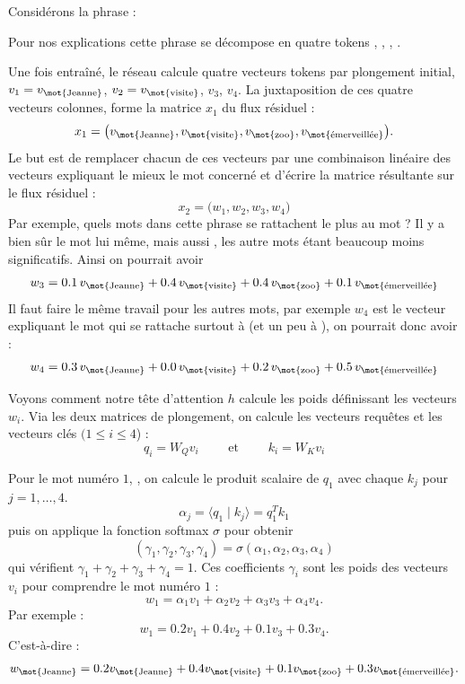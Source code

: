 \documentclass[11pt,class=report,crop=false]{standalone}
\begin{document}
Considérons la phrase :


Pour nos explications cette phrase se décompose en quatre tokens , ,
, . 

Une fois entraîné, le réseau calcule quatre vecteurs tokens par plongement initial,
$v_1 =  v_{\text{\mot{Jeanne}}}$, $v_2 = v_{\text{\mot{visite}}}$, $v_3$, $v_4$.
La juxtaposition de ces quatre vecteurs colonnes, forme la matrice $x_1$ du flux résiduel :
$$x_ 1 = \big( 
v_{\text{\mot{Jeanne}}},
v_{\text{\mot{visite}}}, 
v_{\text{\mot{zoo}}},
v_{\text{\mot{émerveillée}}} \big).$$
Le but est de remplacer chacun de ces vecteurs par une combinaison linéaire des vecteurs expliquant le mieux le mot concerné et d'écrire la matrice résultante sur le flux résiduel :
$$x_2 = \big(w_1, w_2, w_3, w_4\big)$$
Par exemple, quels mots dans cette phrase se rattachent le plus au mot  ?
Il y a bien sûr le mot  lui même, mais aussi , les autre mots étant beaucoup moins significatifs. Ainsi on pourrait avoir 
$$w_3 = 
0.1 \, v_{\text{\mot{Jeanne}}}
+ 0.4 \,v_{\text{\mot{visite}}}
+ 0.4\, v_{\text{\mot{zoo}}}
+0.1\, v_{\text{\mot{émerveillée}}}
$$
Il faut faire le même travail pour les autres mots, par exemple $w_4$ est le vecteur expliquant le mot  qui se rattache surtout à  (et un peu à ), on pourrait donc avoir :
$$w_4 = 
0.3 \,v_{\text{\mot{Jeanne}}}
+ 0.0\, v_{\text{\mot{visite}}}
+ 0.2\, v_{\text{\mot{zoo}}}
+0.5\, v_{\text{\mot{émerveillée}}}
$$


Voyons comment notre tête d'attention $h$ calcule les poids définissant les vecteurs $w_i$.
Via les deux matrices de plongement, on calcule les vecteurs requêtes et les vecteurs clés $(1 \le i \le 4$) :
$$q_i =  W_Q v_i \qquad \text{ et } \qquad k_i =  W_K v_i$$


Pour le mot numéro $1$, , on calcule le produit scalaire de $q_1$ avec chaque $k_j$ pour $j=1,\ldots,4$.
$$\alpha_j = \langle q_1 \mid k_j \rangle = q_1^T k_1$$
puis on applique la fonction softmax $\sigma$ pour obtenir 
$$(\gamma_1, \gamma_2, \gamma_3, \gamma_4)  = \sigma(\alpha_1, \alpha_2, \alpha_3, \alpha_4)$$
qui vérifient $\gamma_1 + \gamma_2 + \gamma_3 + \gamma_4 = 1$.
Ces coefficients $\gamma_i$ sont les poids des vecteurs $v_i$ pour comprendre le mot numéro $1$ :
$$w_1 = \alpha_1 v_1 + \alpha_2 v_2 + \alpha_3 v_3 + \alpha_4 v_4.$$
Par exemple :
$$w_1 = 0.2 v_1 + 0.4 v_2 + 0.1 v_3 + 0.3 v_4.$$ 
C'est-à-dire :
$$w_{\text{\mot{Jeanne}}} = 0.2 v_{\text{\mot{Jeanne}}} + 0.4 v_{\text{\mot{visite}}} + 0.1 v_{\text{\mot{zoo}}} + 0.3 v_{\text{\mot{émerveillée}}}.$$ 
\end{document}
